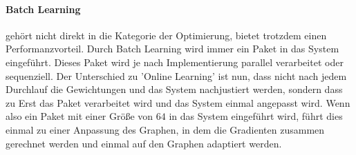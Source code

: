 \paragraph{Batch Learning} gehört nicht direkt in die Kategorie der Optimierung, bietet trotzdem einen Performanzvorteil. 
Durch Batch Learning wird immer ein Paket in das System eingeführt. 
Dieses Paket wird je nach Implementierung parallel verarbeitet oder sequenziell. 
Der Unterschied zu 'Online Learning' ist nun, dass nicht nach jedem Durchlauf die Gewichtungen und das System nachjustiert werden, sondern dass zu Erst das Paket verarbeitet wird und das System einmal angepasst wird. 
Wenn also ein Paket mit einer Größe von $64$ in das System eingeführt wird, führt dies einmal zu einer Anpassung des Graphen, in dem die Gradienten zusammen gerechnet werden und einmal auf den Graphen adaptiert werden. \cite{AI3}






